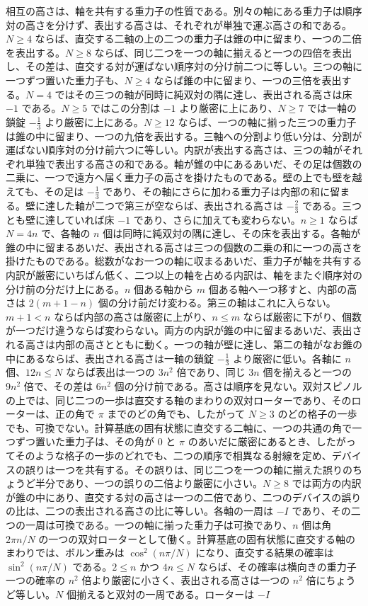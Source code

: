\documentclass[a4paper]{article}
\begin{document}
相互の高さは、軸を共有する重力子の性質である。別々の軸にある重力子は順序対の高さを分けず、表出する高さは、それぞれが単独で運ぶ高さの和である。\(N\ge 4\) ならば、直交する二軸の上の二つの重力子は錐の中に留まり、一つの二倍を表出する。\(N\ge 8\) ならば、同じ二つを一つの軸に揃えると一つの四倍を表出し、その差は、直交する対が運ばない順序対の分け前二つに等しい。三つの軸に一つずつ置いた重力子も、\(N\ge 4\) ならば錐の中に留まり、一つの三倍を表出する。\(N=4\) ではその三つの軸が同時に純双対の隅に達し、表出される高さは床 \(-1\) である。\(N\ge 5\) ではこの分割は \(-1\) より厳密に上にあり、\(N\ge 7\) では一軸の鎖錠 \(-\frac13\) より厳密に上にある。\(N\ge 12\) ならば、一つの軸に揃った三つの重力子は錐の中に留まり、一つの九倍を表出する。三軸への分割より低い分は、分割が運ばない順序対の分け前六つに等しい。内訳が表出する高さは、三つの軸がそれぞれ単独で表出する高さの和である。軸が錐の中にあるあいだ、その足は個数の二乗に、一つで遠方へ届く重力子の高さを掛けたものである。壁の上でも壁を越えても、その足は \(-\frac13\) であり、その軸にさらに加わる重力子は内部の和に留まる。壁に達した軸が二つで第三が空ならば、表出される高さは \(-\frac23\) である。三つとも壁に達していれば床 \(-1\) であり、さらに加えても変わらない。\(n\ge 1\) ならば \(N=4n\) で、各軸の \(n\) 個は同時に純双対の隅に達し、その床を表出する。各軸が錐の中に留まるあいだ、表出される高さは三つの個数の二乗の和に一つの高さを掛けたものである。総数がなお一つの軸に収まるあいだ、重力子が軸を共有する内訳が厳密にいちばん低く、二つ以上の軸を占める内訳は、軸をまたぐ順序対の分け前の分だけ上にある。\(n\) 個ある軸から \(m\) 個ある軸へ一つ移すと、内部の高さは \(2(m+1-n)\) 個の分け前だけ変わる。第三の軸はこれに入らない。\(m+1<n\) ならば内部の高さは厳密に上がり、\(n\le m\) ならば厳密に下がり、個数が一つだけ違うならば変わらない。両方の内訳が錐の中に留まるあいだ、表出される高さは内部の高さとともに動く。一つの軸が壁に達し、第二の軸がなお錐の中にあるならば、表出される高さは一軸の鎖錠 \(-\frac13\) より厳密に低い。各軸に \(n\) 個、\(12n\le N\) ならば表出は一つの \(3n^2\) 倍であり、同じ \(3n\) 個を揃えると一つの \(9n^2\) 倍で、その差は \(6n^2\) 個の分け前である。高さは順序を見ない。双対スピノルの上では、同じ二つの一歩は直交する軸のまわりの双対ローターであり、そのローターは、正の角で \(\pi\) までのどの角でも、したがって \(N\ge 3\) のどの格子の一歩でも、可換でない。計算基底の固有状態に直交する二軸に、一つの共通の角で一つずつ置いた重力子は、その角が \(0\) と \(\pi\) のあいだに厳密にあるとき、したがってそのような格子の一歩のどれでも、二つの順序で相異なる射線を定め、デバイスの誤りは一つを共有する。その誤りは、同じ二つを一つの軸に揃えた誤りのちょうど半分であり、一つの誤りの二倍より厳密に小さい。\(N\ge 8\) では両方の内訳が錐の中にあり、直交する対の高さは一つの二倍であり、二つのデバイスの誤りの比は、二つの表出される高さの比に等しい。各軸の一周は \(-I\) であり、その二つの一周は可換である。一つの軸に揃った重力子は可換であり、\(n\) 個は角 \(2\pi n/N\) の一つの双対ローターとして働く。計算基底の固有状態に直交する軸のまわりでは、ボルン重みは \(\cos^2(n\pi/N)\) になり、直交する結果の確率は \(\sin^2(n\pi/N)\) である。\(2\le n\) かつ \(4n\le N\) ならば、その確率は横向きの重力子一つの確率の \(n^2\) 倍より厳密に小さく、表出される高さは一つの \(n^2\) 倍にちょうど等しい。\(N\) 個揃えると双対の一周である。ローターは \(-I\) 
\end{document}
